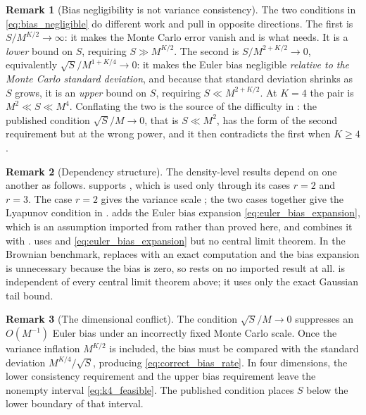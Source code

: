 \documentclass[11pt]{article}
\theoremstyle{definition}
\newtheorem{remark}[remark]{Remark}
\begin{document}
\begin{remark}[Bias negligibility is not variance consistency]\label{rem:bias_vs_variance}
The two conditions in \eqref{eq:bias_negligible} do different work and pull in opposite directions. The first is $S/M^{K/2}\to\infty$: it makes the Monte Carlo error vanish and is what  needs. It is a \emph{lower} bound on $S$, requiring $S\gg M^{K/2}$. The second is $S/M^{2+K/2}\to0$, equivalently $\sqrt S/M^{1+K/4}\to0$: it makes the Euler bias negligible \emph{relative to the Monte Carlo standard deviation}, and because that standard deviation shrinks as $S$ grows, it is an \emph{upper} bound on $S$, requiring $S\ll M^{2+K/2}$. At $K=4$ the pair is $M^2\ll S\ll M^4$. Conflating the two is the source of the difficulty in : the published condition $\sqrt S/M\to0$, that is $S\ll M^2$, has the form of the second requirement but at the wrong power, and it then contradicts the first when $K\ge4$.
\end{remark}

\begin{remark}[Dependency structure]\label{rem:dependencies}
The density-level results depend on one another as follows.  supports , which is used only through its cases $r=2$ and $r=3$. The case $r=2$ gives the variance scale ; the two cases together give the Lyapunov condition in .  adds the Euler bias expansion \eqref{eq:euler_bias_expansion}, which is an assumption imported from \citet{BallyTalay1996a,BallyTalay1996b} rather than proved here, and combines it with .  uses  and \eqref{eq:euler_bias_expansion} but no central limit theorem. In the Brownian benchmark,  replaces  with an exact computation and the bias expansion is unnecessary because the bias is zero, so  rests on no imported result at all.  is independent of every central limit theorem above; it uses only the exact Gaussian tail bound.
\end{remark}

\begin{remark}[The dimensional conflict]
The condition $\sqrt S/M\to0$ suppresses an $O(M^{-1})$ Euler bias under an incorrectly fixed Monte Carlo scale. Once the variance inflation $M^{K/2}$ is included, the bias must be compared with the standard deviation $M^{K/4}/\sqrt S$, producing \eqref{eq:correct_bias_rate}. In four dimensions, the lower consistency requirement and the upper bias requirement leave the nonempty interval \eqref{eq:k4_feasible}. The published condition places $S$ below the lower boundary of that interval.
\end{remark}
\end{document}

